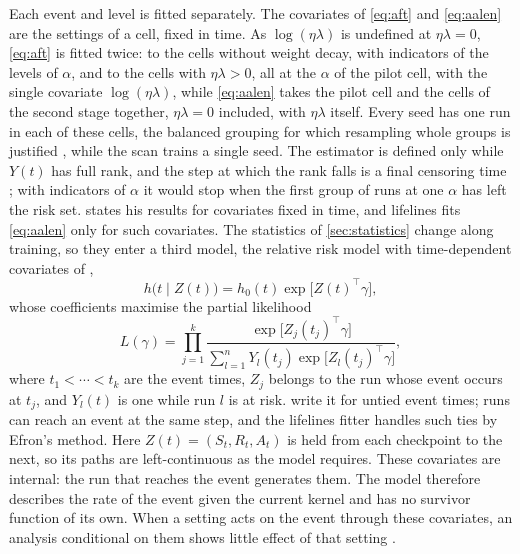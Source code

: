 \documentclass[a4paper,11pt]{article} %
\begin{document}
Each event and level is fitted separately. The covariates of \eqref{eq:aft}
and \eqref{eq:aalen} are the settings of a cell, fixed in time. As
$\log(\eta\lambda)$ is undefined at $\eta\lambda=0$, \eqref{eq:aft} is fitted
twice: to the cells without weight decay, with indicators of the levels of
$\alpha$, and to the cells with $\eta\lambda>0$, all at the $\alpha$ of the
pilot cell, with the single covariate $\log(\eta\lambda)$, while
\eqref{eq:aalen} takes the pilot cell and the cells of the second stage
together, $\eta\lambda=0$ included, with $\eta\lambda$ itself. Every seed has
one run in each of these cells, the balanced grouping for which resampling
whole groups is justified \citep[Sec.~3.8]{davisonBootstrapMethodsTheir1997},
while the scan trains a single seed. The estimator is defined
only while $Y(t)$ has full rank, and the step at which the rank falls is a
final censoring time \citep[Sec.~4.1]{aalenLinearRegressionModel1989}; with
indicators of $\alpha$ it would stop when the first group of runs at one
$\alpha$ has left the risk set.
\citet{aalenLinearRegressionModel1989} states his results for covariates fixed
in time, and lifelines fits \eqref{eq:aalen} only for such covariates. The
statistics of \cref{sec:statistics} change along training, so they enter a
third model, the relative risk model with time-dependent covariates of
\citet{kalbfleischStatisticalAnalysisFailure2002},
\begin{equation}
  h\bigl(t\mid Z(t)\bigr) = h_0(t)\exp\bigl[Z(t)^\top\gamma\bigr],
\end{equation}
whose coefficients maximise the partial likelihood
\begin{equation}
  L(\gamma) = \prod_{j=1}^{k}
  \frac{\exp\bigl[Z_j(t_j)^\top\gamma\bigr]}
  {\sum_{l=1}^{n}Y_l(t_j)\exp\bigl[Z_l(t_j)^\top\gamma\bigr]} ,
\end{equation}
where $t_1<\cdots<t_k$ are the event times, $Z_j$ belongs to the run whose
event occurs at $t_j$, and $Y_l(t)$ is one while run $l$ is at risk.
 write it for untied event
times; runs can reach an event at the same step, and the lifelines fitter
handles such ties by Efron's method. Here
$Z(t)=(S_t,R_t,A_t)$ is held from each checkpoint to the next, so its paths
are left-continuous as the model requires. These covariates are internal:
the run that reaches the event generates them. The model therefore describes
the rate of the event given the current kernel and has no survivor function
of its own. When a setting acts on the event through these covariates, an
analysis conditional on them shows little effect of that setting
\citep{kalbfleischStatisticalAnalysisFailure2002}.
\end{document}
